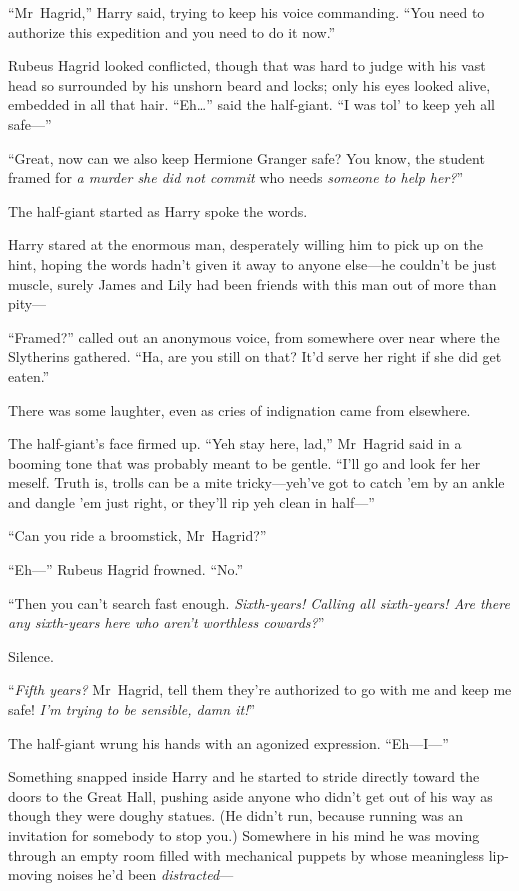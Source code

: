 “Mr~Hagrid,” Harry said, trying to keep his voice commanding. “You need to
authorize this expedition and you need to do it now.”

Rubeus Hagrid looked conflicted, though that was hard to judge with his vast
head so surrounded by his unshorn beard and locks; only his eyes looked alive,
embedded in all that hair. “Eh…” said the half-giant. “I was tol’ to
keep yeh all safe—”

“Great, now can we also keep Hermione Granger safe? You know, the student
framed for \emph{a murder she did not commit} who needs \emph{someone to help
her?}”

The half-giant started as Harry spoke the words.

Harry stared at the enormous man, desperately willing him to pick up on the
hint, hoping the words hadn’t given it away to anyone else—he couldn’t be
just muscle, surely James and Lily had been friends with this man out of more
than pity—

“Framed?” called out an anonymous voice, from somewhere over near where the
Slytherins gathered. “Ha, are you still on that? It’d serve her right if she
did get eaten.”

There was some laughter, even as cries of indignation came from elsewhere.

The half-giant’s face firmed up. “Yeh stay here, lad,” Mr~Hagrid said in a
booming tone that was probably meant to be gentle. “I’ll go and look fer her
meself. Truth is, trolls can be a mite tricky—yeh’ve got to catch ’em by an
ankle and dangle ’em just right, or they’ll rip yeh clean in half—”

“Can you ride a broomstick, Mr~Hagrid?”

“Eh—” Rubeus Hagrid frowned. “No.”

“Then you can’t search fast enough. \emph{Sixth-years! Calling all sixth-years!
Are there any sixth-years here who aren’t worthless cowards?}”

Silence.

“\emph{Fifth years?} Mr~Hagrid, tell them they’re authorized to go with me and
keep me safe! \emph{I’m trying to be sensible, damn it!}”

The half-giant wrung his hands with an agonized expression. “Eh—I—”

Something snapped inside Harry and he started to stride directly toward the
doors to the Great Hall, pushing aside anyone who didn’t get out of his way as
though they were doughy statues. (He didn’t run, because running was an
invitation for somebody to stop you.) Somewhere in his mind he was moving
through an empty room filled with mechanical puppets by whose meaningless
lip-moving noises he’d been \emph{distracted}—

